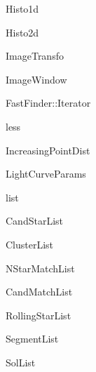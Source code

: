 \begin{CompactList}
\begin{CompactList}
\item {}
\end{CompactList}
\item Histo1d\item Histo2d\item {}
\begin{CompactList}
\item {}
\item {}
\end{CompactList}
\item {}
\item Image\-Transfo\begin{CompactList}
\item {}
\end{CompactList}
\item Image\-Window\item Fast\-Finder::Iterator\item {}
\item less\begin{CompactList}
\item Increasing\-Point\-Dist\end{CompactList}
\item {}
\item Light\-Curve\-Params\item list\begin{CompactList}
\item Cand\-Star\-List\item Cluster\-List\item {}
\item NStar\-Match\-List\begin{CompactList}
\item Cand\-Match\-List\end{CompactList}
\item Rolling\-Star\-List\item Segment\-List\item Sol\-List\item {}

\end{CompactList}
\end{CompactList}
